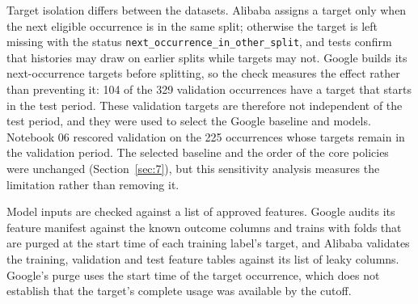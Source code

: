 Target isolation differs between the datasets. Alibaba assigns a target only when the next eligible occurrence is in the same split; otherwise the target is left missing with the status \texttt{next\_occurrence\_in\_other\_split}, and tests confirm that histories may draw on earlier splits while targets may not. Google builds its next-occurrence targets before splitting, so the check measures the effect rather than preventing it: 104 of the 329 validation occurrences have a target that starts in the test period. These validation targets are therefore not independent of the test period, and they were used to select the Google baseline and models. Notebook 06 rescored validation on the 225 occurrences whose targets remain in the validation period. The selected baseline and the order of the core policies were unchanged (Section~\ref{sec:7}), but this sensitivity analysis measures the limitation rather than removing it.

Model inputs are checked against a list of approved features. Google audits its feature manifest against the known outcome columns and trains with folds that are purged at the start time of each training label's target, and Alibaba validates the training, validation and test feature tables against its list of leaky columns. Google's purge uses the start time of the target occurrence, which does not establish that the target's complete usage was available by the cutoff.

